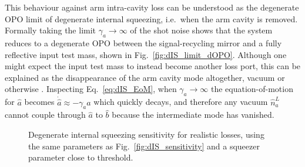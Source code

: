 This behaviour against arm intra-cavity loss can be understood as the degenerate OPO limit of degenerate internal squeezing, i.e.\ when the arm cavity is removed. Formally taking the limit $\gamma_a\rightarrow\infty$ of the shot noise shows that the system reduces to a degenerate OPO between the signal-recycling mirror and a fully reflective input test mass, shown in Fig.~\ref{fig:dIS_limit_dOPO}.  Although one might expect the input test mass to instead become another loss port, this can be explained as the disappearance of the arm cavity mode altogether, vacuum or otherwise . Inspecting Eq.~\ref{eq:dIS_EoM}, when $\gamma_a\rightarrow\infty$ the equation-of-motion for $\hat a$ becomes $\dot{\hat a}\approx -\gamma_a \hat a$ which quickly decays, and therefore any vacuum $\hat n^L_a$ cannot couple through $\hat a$ to $\hat b$ because the intermediate mode has vanished.


\begin{figure}
	\centering
	\caption{Degenerate internal squeezing sensitivity for realistic losses, using the same parameters as Fig.~\ref{fig:dIS_sensitivity} and a squeezer parameter close to threshold. }
	\label{fig:dIS_realistic_loss}
\end{figure}

